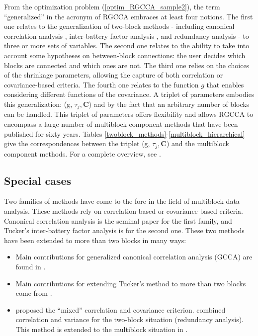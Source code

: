 \documentclass[
]{jss}
\begin{document}
From the optimization problem (\ref{optim_RGCCA_sample2}), the term
``generalized'' in the acronym of RGCCA embraces at least four notions.
The first one relates to the generalization of two-block methods -
including canonical correlation analysis \citep{Hotelling1936},
inter-battery factor analysis \citep{Tucker1958}, and redundancy
analysis \citep{Wollenberg1977} - to three or more sets of variables.
The second one relates to the ability to take into account some
hypotheses on between-block connections: the user decides which blocks
are connected and which ones are not. The third one relies on the
choices of the shrinkage parameters, allowing the capture of both
correlation or covariance-based criteria. The fourth one relates to the
function \(g\) that enables considering different functions of the
covariance. A triplet of parameters embodies this generalization: (g,
\(\tau_j, \mathbf C\)) and by the fact that an arbitrary number of
blocks can be handled. This triplet of parameters offers flexibility and
allows RGCCA to encompass a large number of multiblock component methods
that have been published for sixty years. Tables
\ref{twoblock_methods}-\ref{multiblock_hierarchical} give the
correspondences between the triplet (g, \(\tau_j, \mathbf C\)) and the
multiblock component methods. For a complete overview, see
\cite{Tenenhaus2017}.

\subsection{Special cases}\label{special-cases}

Two families of methods have come to the fore in the field of multiblock
data analysis. These methods rely on correlation-based or
covariance-based criteria. Canonical correlation analysis
\citep{Hotelling1936} is the seminal paper for the first family, and
Tucker's inter-battery factor analysis \citep{Tucker1958} is for the
second one. These two methods have been extended to more than two blocks
in many ways:

\begin{itemize}
\item
  Main contributions for generalized canonical correlation analysis
  (GCCA) are found in
  \cite{Horst1961, Carroll1968a, Kettenring1971, Wold1982, Wold1985, Hanafi2007}.
\item
  Main contributions for extending Tucker's method to more than two
  blocks come from
  \cite{Carroll1968b, Chessel1996, Hanafi2006, Hanafi2010, Hanafi2011, Hanafi2006, Kramer2007, Smilde2003, TenBerge1988, VandeGeer1984, Westerhuis1998, Wold1982, Wold1985}.
\item
  \cite{Carroll1968b} proposed the ``mixed'' correlation and covariance
  criterion. \cite{Wollenberg1977} combined correlation and variance for
  the two-block situation (redundancy analysis). This method is extended
  to the multiblock situation in \cite{Tenenhaus2011, Tenenhaus2017}.
\end{itemize}
\end{document}
